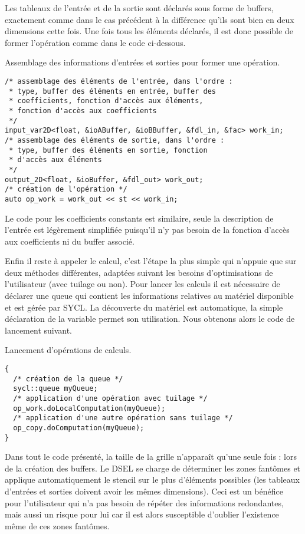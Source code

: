 Les tableaux de l'entrée et de la sortie sont déclarés sous forme de buffers, exactement comme dans le cas précédent à la différence qu'ils sont bien en deux dimensions cette fois. Une fois tous les éléments déclarés, il est donc possible de former l'opération comme dans le code ci-dessous.
\begin{listing}[H]
\caption{Assemblage des informations d'entrées et sorties pour former une opération.}
\label{lst:tab_io}
\begin{verbatim}
/* assemblage des éléments de l'entrée, dans l'ordre :
 * type, buffer des éléments en entrée, buffer des 
 * coefficients, fonction d'accès aux éléments,
 * fonction d'accès aux coefficients
 */
input_var2D<float, &ioABuffer, &ioBBuffer, &fdl_in, &fac> work_in;
/* assemblage des éléments de sortie, dans l'ordre :
 * type, buffer des éléments en sortie, fonction
 * d'accès aux éléments
 */
output_2D<float, &ioBuffer, &fdl_out> work_out;
/* création de l'opération */
auto op_work = work_out << st << work_in;
\end{verbatim}
\end{listing}
Le code pour les coefficients constants est similaire, seule la description de l'entrée est légèrement simplifiée puisqu'il n'y pas besoin de la fonction d'accès aux coefficients ni du buffer associé. 

Enfin il reste à appeler le calcul, c'est l'étape la plus simple qui n'appuie que sur deux méthodes différentes, adaptées suivant les besoins d'optimisations de l'utilisateur (avec tuilage ou non). Pour lancer les calculs il est nécessaire de déclarer une queue qui contient les informations relatives au matériel disponible et est gérée par \textsf{SYCL}. La découverte du matériel est automatique, la simple déclaration de la variable permet son utilisation. Nous obtenons alors le code de lancement suivant.
\begin{listing}[H]
\caption{Lancement d'opérations de calculs.}
\begin{verbatim}
{   
  /* création de la queue */
  sycl::queue myQueue; 
  /* application d'une opération avec tuilage */
  op_work.doLocalComputation(myQueue);
  /* application d'une autre opération sans tuilage */
  op_copy.doComputation(myQueue);
}
\end{verbatim}
\end{listing}

Dans tout le code présenté, la taille de la grille n'apparaît qu'une seule fois : lors de la création des buffers. Le DSEL se charge de déterminer les zones fantômes et applique automatiquement le stencil sur le plus d'éléments possibles (les tableaux d'entrées et sorties doivent avoir les mêmes dimensions). Ceci est un bénéfice pour l'utilisateur qui n'a pas besoin de répéter des informations redondantes, mais aussi un risque pour lui car il est alors susceptible d'oublier l'existence même de ces zones fantômes. 


